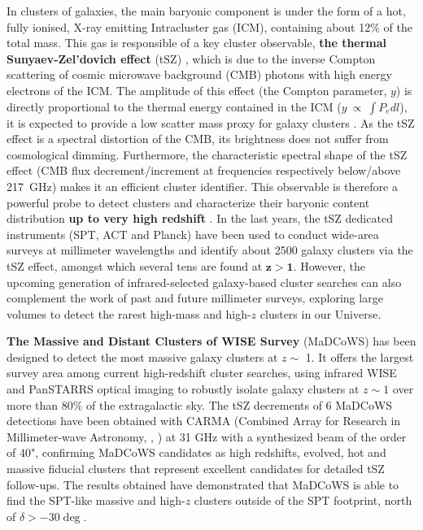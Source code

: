 \documentclass[11pt,a4paper,twoside,graphicx,color]{article}
\begin{document}
In clusters of galaxies, the main baryonic component is under the form of a hot, fully ionised, X-ray emitting Intracluster gas (ICM), containing about 12\% of the total mass. This gas is responsible of a key cluster observable, \textbf{the thermal Sunyaev-Zel'dovich effect} (tSZ) \cite{sun72}, which is due to the inverse Compton scattering of cosmic microwave background (CMB) photons with high energy electrons of the ICM. The amplitude of this effect (the Compton parameter, $y$) is directly proportional to the thermal energy contained in the ICM ($y~\propto~\int P_e dl$), it is expected to provide a low scatter mass proxy for galaxy clusters \cite{nag07}. As the tSZ effect is a spectral distortion of the CMB, its brightness does not suffer from cosmological dimming. Furthermore, the characteristic spectral shape of the tSZ effect (CMB flux decrement/increment at frequencies respectively below/above 217~GHz) makes it an efficient cluster identifier. This observable is therefore a powerful probe to detect clusters and characterize their baryonic content distribution \textbf{up to very high redshift} \cite{ble15,has13,pla15}. In the last years, the tSZ dedicated instruments (SPT, ACT and Planck) have been used to conduct wide-area surveys at millimeter wavelengths and identify about 2500 galaxy clusters via the tSZ effect, amongst which several tens are found at $\mathbf{z > 1}$. However, the upcoming generation of infrared-selected galaxy-based cluster searches can also complement the work of past and future millimeter surveys, exploring large volumes to detect the rarest high-mass and high-$z$ clusters in our Universe. 

\noindent \textbf{The Massive and Distant Clusters of WISE Survey} (MaDCoWS) has been designed to detect the most massive galaxy clusters at $z \sim$ 1. It offers the largest survey area among current high-redshift cluster searches, using infrared WISE and PanSTARRS optical imaging to robustly isolate galaxy clusters at $z \sim 1$ over more than 80\% of the extragalactic sky. The tSZ decrements of 6 MaDCoWS detections have been obtained with CARMA (Combined Array for Research in Millimeter-wave Astronomy, \cite{brodwin15}, \cite{gonz15}) at 31 GHz with a synthesized beam of the order of 40", confirming MaDCoWS candidates as high redshifts, evolved, hot and massive fiducial clusters that represent excellent candidates for detailed tSZ follow-ups. The results obtained have demonstrated that MaDCoWS is able to find the SPT-like massive and high-$z$ clusters outside of the SPT footprint, north of $\delta > -30\deg$.
\end{document}

